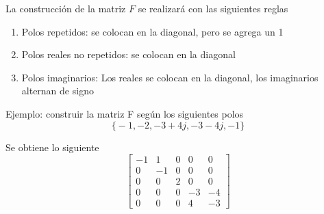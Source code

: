 La construcción de la matriz \( F \) se realizará con las siguientes reglas
\begin{enumerate}
    \item Polos repetidos: se colocan en la diagonal, pero se agrega un 1
    \item Polos reales no repetidos: se colocan en la diagonal
    \item Polos imaginarios: Los reales se colocan en la diagonal, los imaginarios alternan de signo
\end{enumerate}

Ejemplo: construir la matriz F según los siguientes polos
\[
    \Big\{ -1, -2, -3+4j, -3-4j, -1 \Big\}
\]

Se obtiene lo siguiente
\[
    \begin{bmatrix}
        -1 & 1 & 0 & 0 & 0 \\
        0 & -1 & 0 & 0 & 0 \\
        0 & 0 & 2 & 0 & 0 \\
        0 & 0 & 0 & -3 & -4 \\
        0 & 0 & 0 & 4 & -3
    \end{bmatrix}
\]